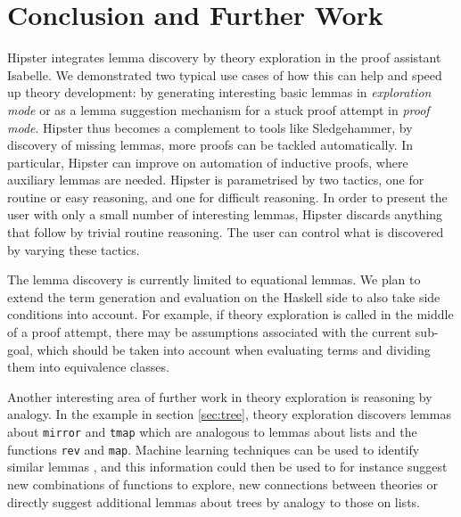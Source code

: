 \section{Conclusion and Further Work}
\label{sec:concl}

Hipster integrates lemma discovery by theory exploration in the proof assistant Isabelle. We demonstrated two typical use cases of how this can help and speed up theory development: by generating interesting basic lemmas in \emph{exploration mode} or as a lemma suggestion mechanism for a stuck proof attempt in \emph{proof mode}. Hipster thus becomes a complement to tools like Sledgehammer, by discovery of missing lemmas, more proofs can be tackled automatically. In particular, Hipster can improve on automation of inductive proofs, where auxiliary lemmas are needed. Hipster is parametrised by two tactics, one for routine or easy reasoning, and one for difficult reasoning. In order to present the user with only a small number of interesting lemmas, Hipster discards anything that follow by trivial routine reasoning. The user can control what is discovered by varying these tactics.

The lemma discovery is currently limited to equational lemmas. We plan to extend the term generation and evaluation on the Haskell side to also take side conditions into account. For example, if theory exploration is called in the middle of a proof attempt, there may be assumptions associated with the current sub-goal, which should be taken into account when evaluating terms and dividing them into equivalence classes. 

Another interesting area of further work in theory exploration is reasoning by analogy. In the example in section \ref{sec:tree}, theory exploration discovers lemmas about \texttt{mirror} and \texttt{tmap} which are analogous to lemmas about lists and the functions \texttt{rev} and \texttt{map}. Machine learning techniques can be used to identify similar lemmas \cite{acl2ml}, and this information could then be used to for instance suggest new combinations of functions to explore, new connections between theories or directly suggest additional lemmas about trees by analogy to those on lists.  

